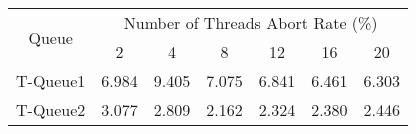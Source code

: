 \begin{tabular}{|c|c|c|c|c|c|c|}
\hline
\multirow{2}{*}{Queue} & \multicolumn{6}{c|}{Number of Threads Abort Rate (\%)}\\\cline{2-7}& 2 & 4 & 8 & 12 & 16 & 20\\
\hline
\hline
T-Queue1 & 6.984 & 9.405 & 7.075 & 6.841 & 6.461 & 6.303\\
T-Queue2 & 3.077 & 2.809 & 2.162 & 2.324 & 2.380 & 2.446\\
\hline\end{tabular}
